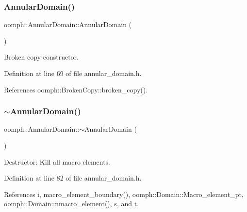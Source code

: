 \subsubsection{\texorpdfstring{Annular\+Domain()}{AnnularDomain()}\hspace{0.1cm}{\footnotesize\ttfamily [2/2]}}
{\footnotesize\ttfamily oomph\+::\+Annular\+Domain\+::\+Annular\+Domain (\begin{DoxyParamCaption}\item[{const \hyperlink{classoomph_1_1AnnularDomain}{Annular\+Domain} \&}]{ }\end{DoxyParamCaption})\hspace{0.3cm}{\ttfamily [inline]}}



Broken copy constructor. 



Definition at line 69 of file annular\+\_\+domain.\+h.



References oomph\+::\+Broken\+Copy\+::broken\+\_\+copy().

\mbox{\label{classoomph_1_1AnnularDomain_a99ee51c9e5fd12fdd123ede8da09c483}} 
\subsubsection{\texorpdfstring{$\sim$\+Annular\+Domain()}{~AnnularDomain()}}
{\footnotesize\ttfamily oomph\+::\+Annular\+Domain\+::$\sim$\+Annular\+Domain (\begin{DoxyParamCaption}{ }\end{DoxyParamCaption})\hspace{0.3cm}{\ttfamily [inline]}}



Destructor\+: Kill all macro elements. 



Definition at line 82 of file annular\+\_\+domain.\+h.



References i, macro\+\_\+element\+\_\+boundary(), oomph\+::\+Domain\+::\+Macro\+\_\+element\+\_\+pt, oomph\+::\+Domain\+::nmacro\+\_\+element(), s, and t.



